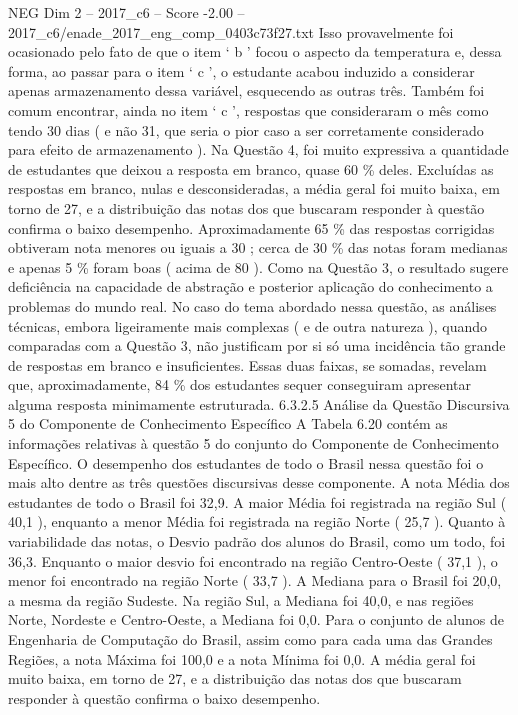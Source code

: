 \begin{textsample}{NEG Dim 2 – 2017\_c6 – Score -2.00 – 2017\_c6/enade\_2017\_eng\_comp\_0403c73f27.txt}
Isso provavelmente foi ocasionado pelo fato de que o item ‘ b ’ focou o aspecto da temperatura e, dessa forma, ao passar para o item ‘ c ’, o estudante acabou induzido a considerar apenas armazenamento dessa variável, esquecendo as outras três.
Também foi comum encontrar, ainda no item ‘ c ’, respostas que consideraram o mês como tendo 30 dias ( e não 31, que seria o pior caso a ser corretamente considerado para efeito de armazenamento ).
Na Questão 4, foi muito expressiva a quantidade de estudantes que deixou a resposta em branco, quase 60 \% deles.
Excluídas as respostas em branco, nulas e desconsideradas, a média geral foi muito baixa, em torno de 27, e a distribuição das notas dos que buscaram responder à questão confirma o baixo desempenho.
Aproximadamente 65 \% das respostas corrigidas obtiveram nota menores ou iguais a 30 ; cerca de 30 \% das notas foram medianas e apenas 5 \% foram boas ( acima de 80 ).
Como na Questão 3, o resultado sugere deficiência na capacidade de abstração e posterior aplicação do conhecimento a problemas do mundo real.
No caso do tema abordado nessa questão, as análises técnicas, embora ligeiramente mais complexas ( e de outra natureza ), quando comparadas com a Questão 3, não justificam por si só uma incidência tão grande de respostas em branco e insuficientes.
Essas duas faixas, se somadas, revelam que, aproximadamente, 84 \% dos estudantes sequer conseguiram apresentar alguma resposta minimamente estruturada. 6.3.2.5 Análise da Questão Discursiva 5 do Componente de Conhecimento Específico A Tabela 6.20 contém as informações relativas à questão 5 do conjunto do Componente de Conhecimento Específico.
O desempenho dos estudantes de todo o Brasil nessa questão foi o mais alto dentre as três questões discursivas desse componente.
A nota Média dos estudantes de todo o Brasil foi 32,9.
A maior Média foi registrada na região Sul ( 40,1 ), enquanto a menor Média foi registrada na região Norte ( 25,7 ).
Quanto à variabilidade das notas, o Desvio padrão dos alunos do Brasil, como um todo, foi 36,3.
Enquanto o maior desvio foi encontrado na região Centro-Oeste ( 37,1 ), o menor foi encontrado na região Norte ( 33,7 ).
A Mediana para o Brasil foi 20,0, a mesma da região Sudeste.
Na região Sul, a Mediana foi 40,0, e nas regiões Norte, Nordeste e Centro-Oeste, a Mediana foi 0,0.
Para o conjunto de alunos de Engenharia de Computação do Brasil, assim como para cada uma das Grandes Regiões, a nota Máxima foi 100,0 e a nota Mínima foi 0,0.
A média geral foi muito baixa, em torno de 27, e a distribuição das notas dos que buscaram responder à questão confirma o baixo desempenho.

\end{textsample}
